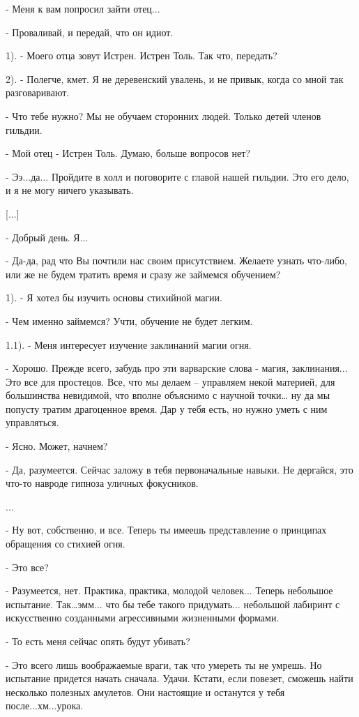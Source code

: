 \documentclass[12pt,a4paper]{book}
\begin{document}
- Меня к вам попросил зайти отец...

- Проваливай, и передай, что он идиот.

1). - Моего отца зовут Истрен. Истрен Толь. Так что, передать?

2). - Полегче, кмет. Я не деревенский увалень, и не привык, когда со мной так разговаривают.

- Что тебе нужно? Мы не обучаем сторонних людей. Только детей членов гильдии.

- Мой отец - Истрен Толь. Думаю, больше вопросов нет?

- Ээ...да... Пройдите в холл и поговорите с главой нашей гильдии. Это его дело, и я не могу ничего указывать.

[...]

- Добрый день. Я...

- Да-да, рад что Вы почтили нас своим присутствием. Желаете узнать что-либо, или же не будем тратить время и сразу же займемся обучением?

1). - Я хотел бы изучить основы стихийной магии.

- Чем именно займемся? Учти, обучение не будет легким.

1.1). - Меня интересует изучение заклинаний магии огня.

- Хорошо. Прежде всего, забудь про эти варварские слова - магия, заклинания... Это все для простецов. Все, что мы делаем – управляем некой материей, для большинства невидимой, что вполне объяснимо с научной точки… ну да мы попусту тратим драгоценное время. Дар у тебя есть, но нужно уметь с ним управляться.

- Ясно. Может, начнем?

- Да, разумеется. Сейчас заложу в тебя первоначальные навыки. Не дергайся, это что-то навроде гипноза уличных фокусников.

...

- Ну вот, собственно, и все. Теперь ты имеешь представление о принципах обращения со стихией огня.

- Это все?

- Разумеется, нет. Практика, практика, молодой человек... Теперь небольшое испытание. Так…эмм... что бы тебе такого придумать... небольшой лабиринт с искусственно созданными агрессивными жизненными формами.

- То есть меня сейчас опять будут убивать?

- Это всего лишь воображаемые враги, так что умереть ты не умрешь. Но испытание придется начать сначала. Удачи. Кстати, если повезет, сможешь найти несколько полезных амулетов. Они настоящие и останутся у тебя после...хм...урока.
\end{document}
